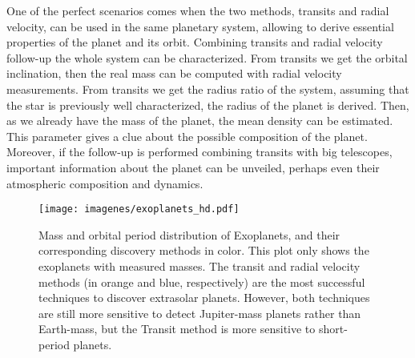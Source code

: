 
One of the perfect scenarios comes when the two methods, transits and radial velocity, can be used in the same planetary system, allowing to derive essential properties of the planet and its orbit. Combining transits and radial velocity follow-up the whole system can be characterized. From transits we get the orbital inclination, then the real mass can be computed with radial velocity measurements. From transits we get the radius ratio of the system, assuming that the star is previously well characterized, the radius of the planet is derived. Then, as we already have the mass of the planet, the mean density can be estimated. This parameter gives a clue about the possible composition of the planet. Moreover, if the follow-up is performed combining transits with big telescopes, important information about the planet can be unveiled, perhaps even their atmospheric composition and dynamics.

\begin{figure}[t]
\centering
\texttt{[image: imagenes/exoplanets\_hd.pdf]}
\caption{Mass and orbital period distribution of Exoplanets, and their corresponding discovery methods in color. This plot only shows the exoplanets with measured masses. The transit and radial velocity methods (in orange and blue, respectively) are the most successful techniques to discover extrasolar planets. However, both techniques are still more sensitive to detect Jupiter-mass planets rather than Earth-mass, but the Transit method is more sensitive to short-period planets.}
\label{exoplanets}
\end{figure}



